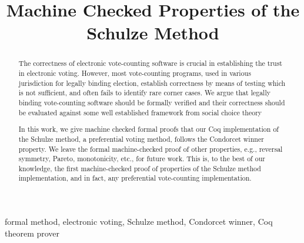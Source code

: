 \documentclass[compsoc,conference,a4paper,10pt,times]{IEEEtran}
\begin{document}
\title{Machine Checked Properties of the Schulze Method}

\author{
\and
{}
}

\maketitle

\begin{abstract}
The correctness of electronic vote-counting software is 
crucial in establishing the trust in electronic voting. 
However, most vote-counting programs, used in 
various jurisdiction for legally binding election, establish
correctness by means of testing which is not sufficient, and often
fails to identify rare corner cases.
We argue that legally binding vote-counting software 
should be formally verified and their correctness should be 
evaluated against some well established framework from social choice theory

In this work, 
we give machine checked formal proofs that our Coq implementation of the Schulze method,
a preferential voting method, 
follows the Condorcet winner property. We leave the formal machine-checked proof of 
other properties, e.g., reversal symmetry, Pareto, monotonicity, etc., for future work. 
This is, to the best of our knowledge, the first machine-checked proof of 
properties of the Schulze method implementation, and in fact, any preferential vote-counting 
implementation. 


\end{abstract}

\begin{IEEEkeywords}
formal method, electronic voting, Schulze method, 
Condorcet winner, Coq theorem prover
\end{IEEEkeywords}

 
\end{document}
